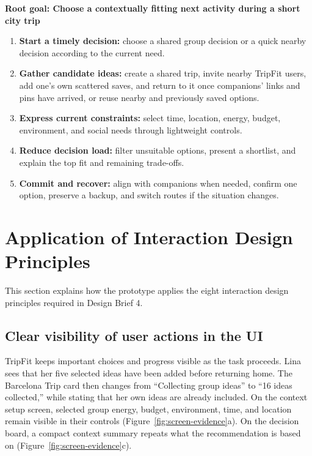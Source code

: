 \documentclass[11pt,a4paper]{article}
\begin{document}
\begin{tripfitbox}
\textbf{Root goal: Choose a contextually fitting next activity during a short city trip}
\begin{enumerate}[leftmargin=1.5em, itemsep=0.15em, topsep=0.4em]
    \item \textbf{Start a timely decision:} choose a shared group decision or a quick nearby decision according to the current need.
    \item \textbf{Gather candidate ideas:} create a shared trip, invite nearby TripFit users, add one's own scattered saves, and return to it once companions' links and pins have arrived, or reuse nearby and previously saved options.
    \item \textbf{Express current constraints:} select time, location, energy, budget, environment, and social needs through lightweight controls.
    \item \textbf{Reduce decision load:} filter unsuitable options, present a shortlist, and explain the top fit and remaining trade-offs.
    \item \textbf{Commit and recover:} align with companions when needed, confirm one option, preserve a backup, and switch routes if the situation changes.
\end{enumerate}
\end{tripfitbox}

\section{Application of Interaction Design Principles}

This section explains how the prototype applies the eight interaction design principles required in Design Brief 4.

\subsection{Clear visibility of user actions in the UI}

TripFit keeps important choices and progress visible as the task proceeds. Lina sees that her five selected ideas have been added before returning home. The Barcelona Trip card then changes from ``Collecting group ideas'' to ``16 ideas collected,'' while stating that her own ideas are already included. On the context setup screen, selected group energy, budget, environment, time, and location remain visible in their controls (Figure~\ref{fig:screen-evidence}a). On the decision board, a compact context summary repeats what the recommendation is based on (Figure~\ref{fig:screen-evidence}c).
\end{document}
